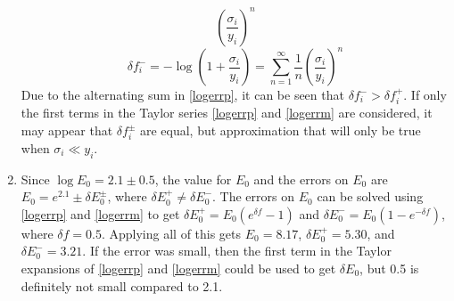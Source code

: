 \documentclass[11pt,letterpaper]{article}
\begin{document}
\begin{enumerate}
\begin{equation}
        \left(\frac{\sigma_i}{y_i}\right)^n
        \label{logerrp}
    \end{equation}
    \begin{equation}
        \delta f_i^- = -\log\left(1 + \frac{\sigma_i}{y_i}\right) =
        \sum_{n=1}^\infty \frac{1}{n} \left(\frac{\sigma_i}{y_i}\right)^n
        \label{logerrm}
    \end{equation}
    Due to the alternating sum in \eqref{logerrp}, it can be seen that
    $\delta f_i^- > \delta f_i^+$. If only the first terms in the Taylor series
    \eqref{logerrp} and \eqref{logerrm} are considered, it may appear that
    $\delta f_i^\pm$ are equal, but approximation that will only be true when
    $\sigma_i \ll y_i$.
\item Since $\log E_0 = 2.1 \pm 0.5$, the value for $E_0$ and the errors on
    $E_0$ are $E_0 = e^{2.1} \pm \delta E_0^\pm$, where $\delta E_0^+ \neq
    \delta E_0^-$. The errors on $E_0$ can be solved using \eqref{logerrp} and
    \eqref{logerrm} to get $\delta E_0^+ = E_0 \left(e^{\delta f} - 1\right)$
    and $\delta E_0^- = E_0 \left(1 - e^{-\delta f}\right)$, where $\delta f =
    0.5$. Applying all of this gets $E_0 = 8.17$, $\delta E_0^+ = 5.30$, and
    $\delta E_0^- = 3.21$. If the error was small, then the first term in the
    Taylor expansions of \eqref{logerrp} and \eqref{logerrm} could be used to
    get $\delta E_0$, but 0.5 is definitely not small compared to 2.1.
\end{enumerate}
\end{document}
